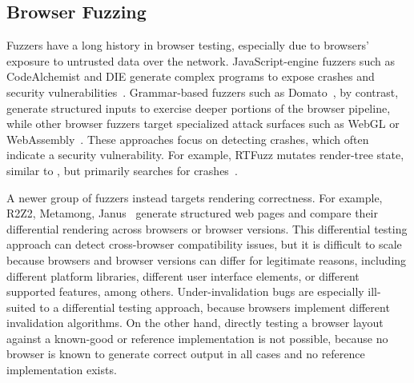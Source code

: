 \subsection{Browser Fuzzing}

Fuzzers have a long history in browser testing,
  especially due to browsers' exposure to untrusted data over the network.
JavaScript-engine fuzzers such as CodeAlchemist and DIE
  generate complex programs to expose
  crashes and security
  vulnerabilities~\cite{han2019codealchemist,park2020die}.
Grammar-based fuzzers such as Domato~\cite{domato},
  by contrast, generate structured inputs to exercise
  deeper portions of the browser pipeline,
  while other browser fuzzers target specialized attack surfaces
  such as WebGL or WebAssembly~\cite{peng2023gleefuzz,draissi2025wemby}.
These approaches focus on detecting crashes,
  which often indicate a security vulnerability.
For example, RTFuzz mutates render-tree state,
  similar to \toolname,
  but primarily searches for crashes~\cite{zeng2026rtfuzz}.

A newer group of fuzzers instead targets rendering correctness.
For example, R2Z2, Metamong, Janus~\cite{song2022r2z2,zhou2025janus}
  generate structured web pages and compare their differential rendering
  across browsers or browser versions.
This differential testing approach can detect
  cross-browser compatibility issues,
  but it is difficult to scale because browsers and browser versions
  can differ for legitimate reasons,
  including different platform libraries,
  different user interface elements,
  or different supported features, among others.
Under-invalidation bugs are especially ill-suited
  to a differential testing approach,
  because browsers implement different invalidation algorithms.
On the other hand, directly testing a browser layout
  against a known-good or reference implementation is not possible,
  because no browser is known to generate correct output in all cases
  and no reference implementation exists.

